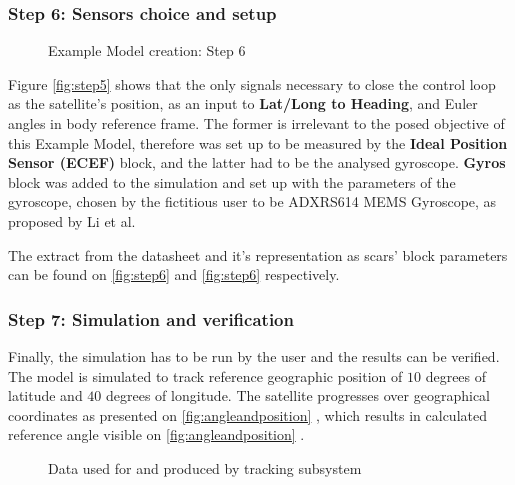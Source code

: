         \subsubsection*{Step 6: Sensors choice and setup}
            \begin{figure}[H]
                \centering
                \qquad
                \caption{Example Model creation: Step 6}%
                \label{fig:step6}%
            \end{figure}
            Figure \autoref{fig:step5} shows that the only signals necessary to close the control loop as the satellite's position, as an input to \textbf{Lat/Long to Heading}, and Euler angles in body reference frame. The former is irrelevant to the posed objective of this Example Model, therefore was set up to be measured by the \textbf{Ideal Position Sensor (ECEF)} block, and the latter had to be the analysed gyroscope. \textbf{Gyros} block was added to the simulation and set up with the parameters of the gyroscope, chosen by the fictitious user to be ADXRS614 MEMS Gyroscope, as proposed by Li et al\cite{li2013design}.
            
            The extract from the datasheet and it's representation as \ac{scars}' block parameters can be found on \autoref{fig:step6}  and \autoref{fig:step6}  respectively.

        \subsubsection*{Step 7: Simulation and verification}
            Finally, the simulation has to be run by the user and the results can be verified. The model is simulated to track reference geographic position of $10$ degrees of latitude and $40$ degrees of longitude. The satellite progresses over geographical coordinates as presented on \autoref{fig:angleandposition} , which results in calculated reference angle visible on \autoref{fig:angleandposition} .

            \begin{figure}[H]
                \centering
                \qquad
                \caption{Data used for and produced by tracking subsystem}%
                \label{fig:angleandposition}%
            \end{figure}
                         
